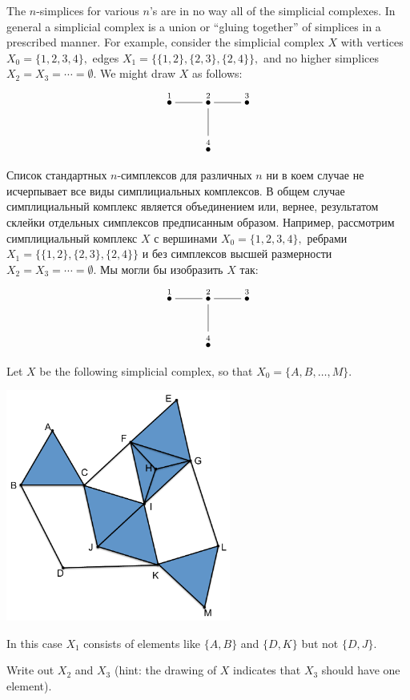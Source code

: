 \documentclass[CT4S-EN-RU]{subfiles}
\begin{document}
\begin{blockENG}
The $n$-simplices for various $n$'s are in no way all of the simplicial complexes. In general a simplicial complex is a union or “gluing together” of simplices in a prescribed manner. For example, consider the simplicial complex $X$ with vertices $X_0=\{1,2,3,4\},$ edges $X_1=\{\{1,2\},\{2,3\},\{2,4\}\},$ and no higher simplices $X_2=X_3=\cdots=\emptyset$. We might draw $X$ as follows:
$$\xymatrix{\LMO{1}\ar@{-}[r]&\LMO{2}\ar@{-}[r]\ar@{-}[d]&\LMO{3}\\&\LMO{4}}$$
\end{blockENG}

\begin{blockRUS}
Список стандартных $n$-симплексов для различных $n$ ни в коем случае не исчерпывает все виды симплициальных комплексов. В общем случае симплициальный комплекс является объединением или, вернее, результатом склейки отдельных симплексов предписанным образом. Например, рассмотрим симплициальный комплекс $X$ с вершинами $X_0=\{1,2,3,4\},$ ребрами $X_1=\{\{1,2\},\{2,3\},\{2,4\}\}$ и без симплексов высшей размерности $X_2=X_3=\cdots=\emptyset$. Мы могли бы изобразить $X$ так:
$$\xymatrix{\LMO{1}\ar@{-}[r]&\LMO{2}\ar@{-}[r]\ar@{-}[d]&\LMO{3}\\&\LMO{4}}$$
\end{blockRUS}

\begin{exerciseENG}
Let $X$ be the following simplicial complex, so that $X_0=\{A,B,\ldots,M\}$. 
\begin{center}
\includegraphics[height=3in]{OlogNetwork5}
\end{center} 
In this case $X_1$ consists of elements like $\{A,B\}$ and $\{D,K\}$ but not $\{D,J\}$. 

Write out $X_2$ and $X_3$ (hint: the drawing of $X$ indicates that $X_3$ should have one element).
\end{exerciseENG}
\end{document}
